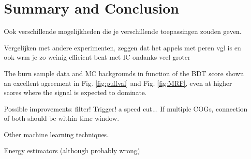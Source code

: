 \chapter{Summary and Conclusion}
Ook verschillende mogelijkheden die je verschillende toepassingen zouden geven.

Vergelijken met andere experimenten, zeggen dat het appels met peren vgl is en ook wrm je zo weinig efficient bent met IC ondanks veel groter

The burn sample data and MC backgrounds in function of the BDT score shown an excellent agreement in Fig. \ref{fig:pullval} and Fig. \ref{fig:MRF}, even at higher scores where the signal is expected to dominate.


Possible improvements: filter! Trigger! a speed cut... If multiple COGs, connection of both should be within time window.

Other machine learning techniques.

Energy estimators (although probably wrong)